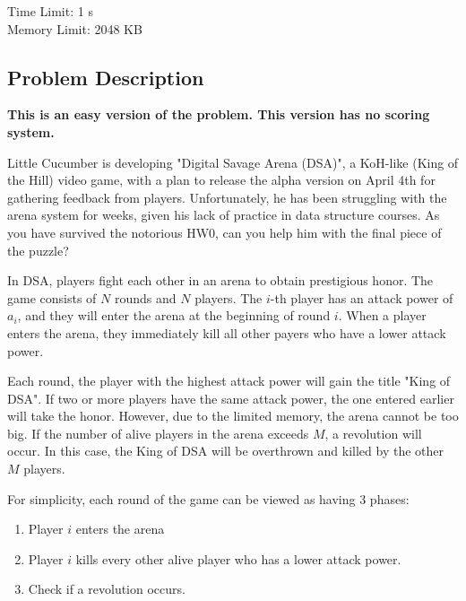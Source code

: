 \providecommand{\tightlist}{\setlength{\itemsep}{0pt}\setlength{\parskip}{0pt}}
\setcounter{secnumdepth}{0}

Time Limit: 1 s \\
Memory Limit: 2048 KB
\vspace{-15pt}

\subsection{Problem Description}\label{problem-description}

\textbf{This is an easy version of the problem. This version has no scoring system.}
\vspace{6pt}

Little Cucumber is developing "Digital Savage Arena (DSA)", a KoH-like (King of the Hill) video game, with a plan to release the alpha version on April 4th for gathering feedback from players. Unfortunately, he has been struggling with the arena system for weeks, given his lack of practice in data structure courses. As you have survived the notorious HW0, can you help him with the final piece of the puzzle?

In DSA, players fight each other in an arena to obtain prestigious honor. The game consists of $N$ rounds and $N$ players. The $i$-th player has an attack power of $a_i$, and they will enter the arena at the beginning of round $i$. When a player enters the arena, they immediately kill all other payers who have a lower attack power. 

Each round, the player with the highest attack power will gain the title "King of DSA". If two or more players have the same attack power, the one entered earlier will take the honor. However, due to the limited memory, the arena cannot be too big. If the number of alive players in the arena exceeds $M$, a revolution will occur. In this case, the King of DSA will be overthrown and killed by the other $M$ players. 

For simplicity, each round of the game can be viewed as having 3 phases:
\vspace{-6pt}
\begin{enumerate}[leftmargin=50pt]
\tightlist
    \item Player $i$ enters the arena
    \item Player $i$ kills every other alive player who has a lower attack power. 
    \item Check if a revolution occurs. 
\end{enumerate}

